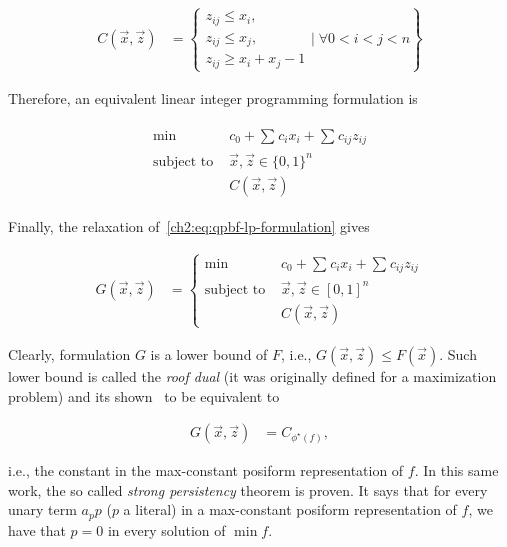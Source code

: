 \begin{align*}
	C(\vec{x},\vec{z}) &= \left\{  \begin{array}{l}
	z_{ij} \leq x_i, \\
	z_{ij} \leq x_j, \\
	z_{ij} \geq x_i + x_j - 1 
	\end{array} \Bigg|\; \forall 0<i<j<n \right\}
\end{align*}

Therefore, an equivalent linear integer programming formulation is

\begin{align}
	\begin{array}{rl}
		\min& c_0 + \sum_{}{c_ix_i} + \sum_{}{c_{ij}z_{ij}} \\
		\text{subject to }&  \vec{x},\vec{z} \in \{0,1\}^n\\
		&C(\vec{x},\vec{z})	
	\end{array}
	\label{ch2:eq:qpbf-lp-formulation}
\end{align}

Finally, the relaxation of~\cref{ch2:eq:qpbf-lp-formulation} gives

\begin{align*}
	G(\vec{x},\vec{z}) &= \left\{ \begin{array}{rl}
		\min& c_0 + \sum_{}{c_ix_i} + \sum_{}{c_{ij}z_{ij}} \\
		\text{subject to }&  \vec{x},\vec{z} \in [0,1]^n\\
		&C(\vec{x},\vec{z})
	\end{array}\right.
\end{align*}

Clearly, formulation $G$ is a lower bound of $F$, i.e.,  $G(\vec{x},\vec{z}) \leq F(\vec{x})$. Such lower bound is called the \emph{roof dual} (it was originally defined for a maximization problem) and its shown~\cite{hammer84} to be equivalent to

\begin{align*}
	G(\vec{x},\vec{z}) &= C_{\phi^{\star}(f)},
\end{align*}

i.e., the constant in the max-constant posiform representation of $f$. In this same work, the so called \emph{strong persistency} theorem is proven. It says that for every unary term $a_pp$ ($p$ a literal) in a max-constant posiform representation of $f$, we have that $p=0$ in every solution of $\min f$.

